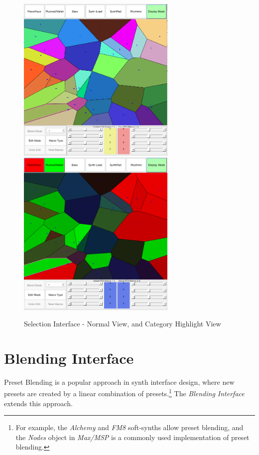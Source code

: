 \documentclass[11pt, oneside]{report}   	%
\begin{document}
\begin{figure}[h] 
	\centering
	\hspace*{-0.2cm}
	\includegraphics[width = 3.0in]{PCAInterface1.png}
	\hspace*{0.1cm}
	\includegraphics[width = 3.0in]{PCAInterface2.png}
	\caption{Selection Interface - Normal View, and Category Highlight View}
	\label{fig:PCAInterface}
\end{figure}

\section{Blending Interface}
Preset Blending is a popular approach in synth interface design, where new presets are created by a linear combination of presets.\footnote{For example, the \emph{Alchemy} and \emph{FM8} soft-synths allow preset blending, and the  \emph{Nodes} object in \emph{Max/MSP} is a commonly used implementation of preset blending.} The \emph{Blending Interface} extends this approach.
\end{document}
